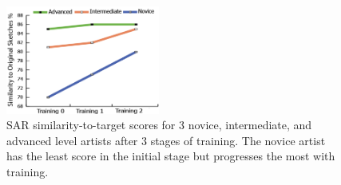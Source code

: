









\vspace{-3mm}
\begin{figure}[ht]
\centering
\includegraphics[width = 0.45\textwidth]{images/TrainingProgress.png}
\vspace{-2mm}\caption {SAR similarity-to-target scores for 3 novice, intermediate, and advanced level artists after 3 stages of training. The novice artist has the least score in the initial stage but progresses the most with training.}
\label{TrainingProgress} \vspace{-4mm}
\end{figure}


